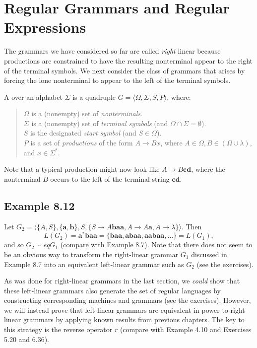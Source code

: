 \section{Regular Grammars and Regular Expressions}\label{sec-8.3}

The grammars we have considered so far are called \emph{right} linear because
productions are constrained to have the resulting nonterminal appear to the
right of the terminal symbols. We next consider the class of grammars that
arises by forcing the lone nonterminal to appear to the left of the terminal
symbols.

\begin{dfn}\label{dfn-8.11}
A \emph{} over an alphabet $\Sigma$ is a quadruple
$G=\langle\Omega,\Sigma,S,P\rangle$, where:

\begin{quote}
$\Omega$ is a (nonempty) set of \emph{nonterminals}. \\
$\Sigma$ is a (nonempty) set of \emph{terminal symbols} (and $\Omega\cap\Sigma =
	\emptyset$). \\
$S$ is the designated \emph{start symbol} (and $S\in\Omega$). \\
$P$ is a set of \emph{productions} of the form $A\rightarrow Bx$, where $A\in\Omega,B
	\in(\Omega\cup\lambda)$, and $x\in\Sigma^*$.
\end{quote}
\end{dfn}
Note that a typical production might now look like $A\rightarrow B\pmb{cd}$,
where the nonterminal $B$ occurs to the left of the terminal string $\pmb{cd}$.

\subsection*{Example 8.12}

Let $G_2=\langle\{A,S\},\{\pmb{a},\pmb{b}\},S,\{S\rightarrow A\pmb{baa},A
\rightarrow A\pmb{a},A\rightarrow \lambda\}\rangle$. Then
\[ L(G_2)=\pmb{a}^*\pmb{baa}=\{\pmb{baa},\pmb{abaa},\pmb{aabaa},\ldots\} =
	L(G_1), \]
and so $G_2 \sim eq G_1$ (compare with Example 8.7). Note that there does not
seem to be an obvious way to transform the right-linear grammar $G_1$ discussed
in Example 8.7 into an equivalent left-linear grammar such as $G_2$ (see the
exercises).

As was done for right-linear grammars in the last section, we \emph{could} show
that these left-linear grammars also generate the set of regular languages by
constructing corresponding machines and grammars (see the exercises). However,
we will instead prove that left-linear grammars are equivalent in power to
right-linear grammars by applying known results from previous chapters. The key
to this strategy is the reverse operator $r$ (compare with Example 4.10 and
Exercises 5.20 and 6.36).

